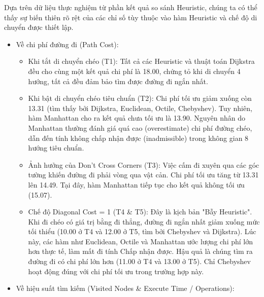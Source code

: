 \documentclass[12pt,a4paper]{report}
\begin{document}
Dựa trên dữ liệu thực nghiệm từ phần kết quả so sánh Heuristic, chúng ta có thể thấy sự biến thiên rõ rệt của các chỉ số tùy thuộc vào hàm Heuristic và chế độ di chuyển được thiết lập.
\begin{itemize}
\item Về chi phí đường đi (Path Cost): 

\begin{itemize}
    \item Khi tắt di chuyển chéo (T1): Tất cả các Heuristic và thuật toán Dijkstra đều cho cùng một kết quả chi phí là 18.00, chứng tỏ khi di chuyển 4 hướng, tất cả đều đảm bảo tìm được đường đi ngắn nhất.
    \item Khi bật di chuyển chéo tiêu chuẩn (T2): Chi phí tối ưu giảm xuống còn 13.31 (tìm thấy bởi Dijkstra, Euclidean, Octile, Chebyshev). Tuy nhiên, hàm Manhattan cho ra kết quả chưa tối ưu là 13.90. Nguyên nhân do Manhattan thường đánh giá quá cao (overestimate) chi phí đường chéo, dẫn đến tính không chấp nhận được (inadmissible) trong không gian 8 hướng tiêu chuẩn.
    \item Ảnh hưởng của Don't Cross Corners (T3): Việc cấm đi xuyên qua các góc tường khiến đường đi phải vòng qua vật cản. Chi phí tối ưu tăng từ 13.31 lên 14.49. Tại đây, hàm Manhattan tiếp tục cho kết quả không tối ưu (15.07).
    \item Chế độ Diagonal Cost = 1 (T4 \& T5): Đây là kịch bản "Bẫy Heuristic". Khi đi chéo có giá trị bằng đi thẳng, đường đi ngắn nhất giảm xuống mức tối thiểu (10.00 ở T4 và 12.00 ở T5, tìm bởi Chebyshev và Dijkstra). Lúc này, các hàm như Euclidean, Octile và Manhattan ước lượng chi phí lớn hơn thực tế, làm mất đi tính Chấp nhận được. Hậu quả là chúng tìm ra đường đi có chi phí lớn hơn (11.00 ở T4 và 13.00 ở T5). Chỉ Chebyshev hoạt động đúng với chi phí tối ưu trong trường hợp này.
\end{itemize}
\item Về hiệu suất tìm kiếm (Visited Nodes \& Execute Time / Operations): 


\end{itemize}
\end{document}
